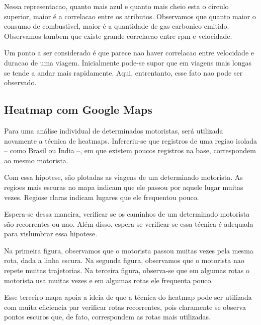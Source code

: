 \documentclass[10pt, conference]{IEEEtran}
\begin{document}
Nessa representacao, quanto mais azul e quanto mais cheio esta o circulo superior, maior
é a correlacao entre os atributos. Observamos que quanto maior o consumo de combustivel,
maior é a quantidade de gas carbonico emitido. Observamos tambem que existe grande
correlacao entre rpm e velocidade. 

Um ponto a ser considerado é que parece nao haver correlacao entre velocidade e duracao
de uma viagem. Inicialmente pode-se supor que em viagens mais longas se tende a andar
mais rapidamente. Aqui, entrentanto, esse fato nao pode ser observado.



\subsection{Heatmap com Google Maps}

Para uma análise individual de determinados motoristas, será utilizada novamente a técnica de heatmaps.
Infereriu-se que registros de uma regiao isolada -- como Brasil ou India --, em que existem poucos
registros na base, correspondem ao mesmo motorista.

Com essa hipotese, são plotadas as viagens de um determinado motorista. As regioes mais escuras no
mapa indicam que ele passou por aquele lugar muitas vezes. Regiose claras indicam lugares que ele
frequentou pouco. 

Espera-se dessa maneira, verificar se os caminhos de um determinado motorista são recorrentes ou nao.
Além disso, espera-se verificar se essa técnica é adequada para vislumbrar essa hipotese.

Na primeira figura, observamos que o motorista passou muitas vezes pela mesma rota, dada a linha escura.
Na segunda figura, observamos que o motorista nao repete muitas trajetorias. Na terceira figura, observa-se
que em algumas rotas o motorista usa muitas vezes e em algumas rotas ele frequenta pouco.

Esse terceiro mapa apoia a ideia de que a técnica do heatmap pode ser utilizada com muita eficiencia par
verificar rotas recorrentes, pois claramente se observa pontos escuros que, de fato, correspondem as 
rotas mais utilizadas.

\end{document}
